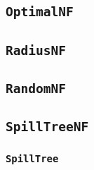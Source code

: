 \subsection{\texttt{OptimalNF}}

\subsection{\texttt{RadiusNF}}

\subsection{\texttt{RandomNF}}

\subsection{\texttt{SpillTreeNF}}

\subsubsection{\texttt{SpillTree}}
